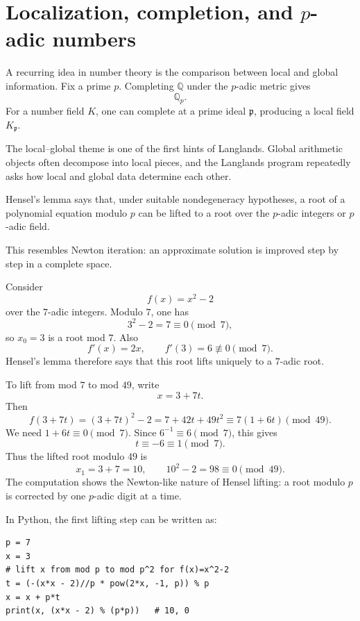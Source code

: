 \section[Localization, completion, and p-adic numbers]{Localization, completion, and \(p\)-adic numbers}

A recurring idea in number theory is the comparison between local and global information.  Fix a prime \(p\).  Completing \(\mathbb Q\) under the \(p\)-adic metric gives
\[
  \mathbb Q_p.
\]
For a number field \(K\), one can complete at a prime ideal \(\mathfrak p\), producing a local field \(K_\mathfrak p\).

\begin{remark}
The local--global theme is one of the first hints of Langlands.  Global arithmetic objects often decompose into local pieces, and the Langlands program repeatedly asks how local and global data determine each other.
\end{remark}

\begin{definition}
Hensel's lemma says that, under suitable nondegeneracy hypotheses, a root of a polynomial equation modulo \(p\) can be lifted to a root over the \(p\)-adic integers or \(p\)-adic field.
\end{definition}

This resembles Newton iteration: an approximate solution is improved step by step in a complete space.

\begin{example}
Consider
\[
  f(x)=x^2-2
\]
over the \(7\)-adic integers.  Modulo \(7\), one has
\[
  3^2-2=7\equiv0\pmod 7,
\]
so \(x_0=3\) is a root mod \(7\).  Also
\[
  f'(x)=2x,
  \qquad
  f'(3)=6\not\equiv0\pmod7.
\]
Hensel's lemma therefore says that this root lifts uniquely to a \(7\)-adic root.

To lift from mod \(7\) to mod \(49\), write
\[
  x=3+7t.
\]
Then
\[
  f(3+7t)=(3+7t)^2-2=7+42t+49t^2
  \equiv 7(1+6t)\pmod{49}.
\]
We need \(1+6t\equiv0\pmod7\).  Since \(6^{-1}\equiv6\pmod7\), this gives
\[
  t\equiv -6\equiv1\pmod7.
\]
Thus the lifted root modulo \(49\) is
\[
  x_1=3+7=10,
  \qquad
  10^2-2=98\equiv0\pmod{49}.
\]
The computation shows the Newton-like nature of Hensel lifting: a root modulo \(p\) is corrected by one \(p\)-adic digit at a time.

In Python, the first lifting step can be written as:
\begin{verbatim}
p = 7
x = 3
# lift x from mod p to mod p^2 for f(x)=x^2-2
t = (-(x*x - 2)//p * pow(2*x, -1, p)) % p
x = x + p*t
print(x, (x*x - 2) % (p*p))   # 10, 0
\end{verbatim}
\end{example}

